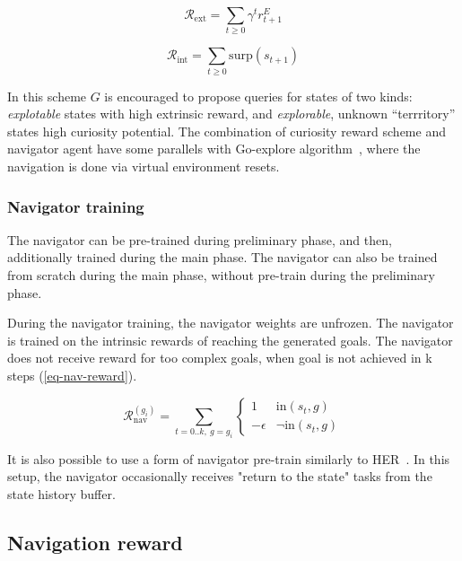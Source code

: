 \documentclass[acmsmall, nonacm]{acmart}
\begin{document}
\begin{equation} \label{eq-gs-est-reward}
\mathcal{R}_\mathrm{ext} = 
\sum_{t \geq 0} \gamma^t r^E_{t+1}
\end{equation}

\begin{equation} \label{eq-gs-int-reward}
\mathcal{R}_\mathrm{int} = 
\sum_{t \ge 0}  \mathrm{surp}(s_{t+1})
\end{equation}

In this scheme $G$ is encouraged to propose queries for states of two kinds: \emph{explotable} states with high extrinsic reward, and \emph{explorable}, unknown ``terrritory'' states high curiosity potential.
%
The combination of curiosity reward scheme and navigator agent have some parallels with Go-explore algorithm~\citep{ecoffet_first_2021}, where the navigation is done via virtual environment resets.

\subsubsection{Navigator training}

The navigator can be pre-trained during preliminary phase, and then, additionally trained during the main phase. The navigator can also be trained from scratch during the main phase, without pre-train during the preliminary phase.

During the navigator training, the navigator weights are unfrozen. The navigator is trained on the intrinsic rewards of reaching the generated goals. The navigator does not receive reward for too complex goals, when goal is not achieved in k steps (\ref{eq-nav-reward}).

\begin{equation} \label{eq-nav-reward}
\mathcal{R}_\mathrm{nav}^{(g_i)}= \sum_{t=0..k,\ g=g_i}
\begin{cases}
1 & \mathrm{in}(s_t, g) \\
-\epsilon & \lnot \mathrm{in}(s_t, g)
\end{cases}
\end{equation}

It is also possible to use a form of navigator pre-train similarly to HER~\citep{andrychowicz_hindsight_2017}. In this setup, the navigator occasionally receives "return to the state" tasks from the state history buffer.

\subsection{Navigation reward}
\label{ssub:navigation_reward}
\end{document}
